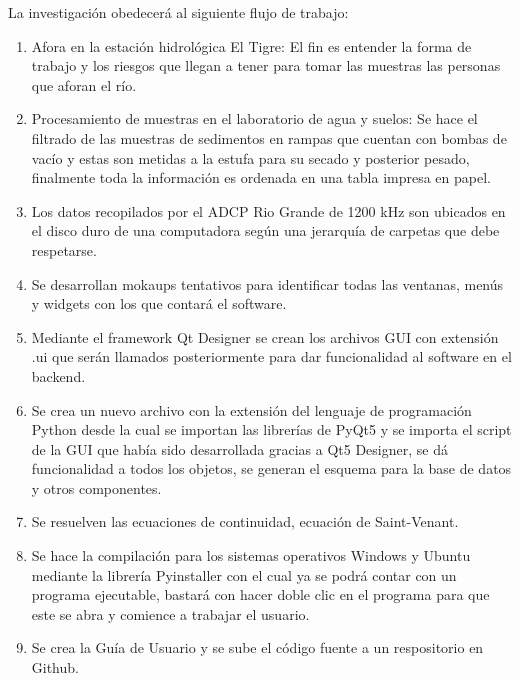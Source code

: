 \documentclass[12pt,a4paper]{report}
\begin{document}
La investigación obedecerá al siguiente flujo de trabajo:
\begin{enumerate}
\item Afora en la estación hidrológica El Tigre: El fin es entender la forma de trabajo y los riesgos que llegan a tener para tomar las muestras las personas que aforan el río.
\item Procesamiento de muestras en el laboratorio de agua y suelos: Se hace el filtrado de las muestras de sedimentos en rampas que cuentan con bombas de vacío y estas son metidas a la estufa para su secado y posterior pesado, finalmente toda la información es ordenada en una tabla impresa en papel.
\item Los datos recopilados por el ADCP Rio Grande de 1200 kHz son ubicados en el disco duro de una computadora según una jerarquía de carpetas que debe respetarse.
\item Se desarrollan mokaups tentativos para identificar todas las ventanas, menús y widgets con los que contará el software.
\item Mediante el framework Qt Designer se crean los archivos GUI con extensión .ui que serán llamados posteriormente para dar funcionalidad al software en el backend.
\item Se crea un nuevo archivo con la extensión del lenguaje de programación Python desde la cual se importan las librerías de PyQt5 y se importa el script de la GUI que había sido desarrollada gracias a Qt5 Designer, se dá funcionalidad a todos los objetos, se generan el esquema para la base de datos y otros componentes.
\item Se resuelven las ecuaciones de continuidad, ecuación de Saint-Venant.
\item Se hace la compilación para los sistemas operativos Windows y Ubuntu mediante la librería Pyinstaller con el cual ya se podrá contar con un programa ejecutable, bastará con hacer doble clic en el programa para que este se abra y comience a trabajar el usuario.
\item Se crea la Guía de Usuario y se sube el código fuente a un respositorio en Github.
\end{enumerate}
\end{document}

